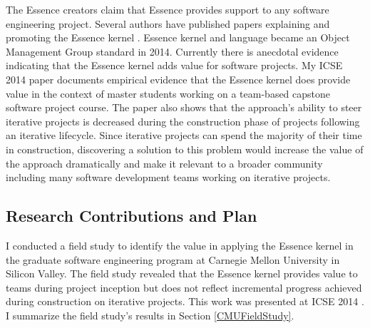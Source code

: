 \documentclass[preprint,12pt,3p]{elsarticle}
\begin{document}
The Essence creators claim that Essence provides support to any software engineering project. Several authors have published papers explaining and promoting the Essence kernel \cite{CallToAction, JacobsonQueue, OMGStandard,  AgileSEMAT, EssenceBook, JacobsonMajorLeaugue, JacobsonNewSoftwareEngineering}. Essence kernel and language became an Object Management Group standard in 2014. Currently there is anecdotal evidence indicating that the Essence kernel adds value for software projects. My ICSE 2014 paper \cite{ICSE2014} documents empirical evidence that the Essence kernel does provide value in the context of master students working on a team-based capstone software project course. 
The paper also shows that the approach's ability to steer iterative projects is decreased during the construction phase of projects following an iterative lifecycle. Since iterative projects can spend the majority of their time in construction, discovering a solution to this problem would increase the value of the approach dramatically and make it relevant to a broader community including many software development teams working on iterative projects.

\subsection{Research Contributions and Plan}

I conducted a field study to identify the value in applying the Essence kernel in the graduate software engineering program at Carnegie Mellon University in Silicon Valley. The field study revealed that the Essence kernel provides value to teams during project inception but does not reflect incremental progress achieved during construction on iterative projects. This work was presented at ICSE 2014 \cite{ICSE2014}. I summarize the field study's results in Section \ref{CMUFieldStudy}.
\end{document}
